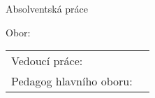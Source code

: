 
\pagestyle{StyleBlank}

\begin{center}

	\begin{Large}
		\noindent
		{\textbf{\MakeUppercase{\skola}}}
	\end{Large}

	\vfill

	\begin{Large}
		\noindent
		Absolventská práce
	\end{Large}

	\begin{spacing}{1.8}
		\begin{huge}
			\noindent
			\textbf{\MakeUppercase{\appTema}}
		\end{huge}
	\end{spacing}

	\vfill

	\begin{Large}
		\noindent
		\textbf{\autor}
	\end{Large}


	\begin{large}
		\noindent
		Obor: {\studijniObor}

		\noindent
		{\studijniProgram}
	\end{large}

\end{center}

\vfill

\begin{large}
	\begin{tabularx}{\textwidth}{ l X }
		Vedoucí práce:	& {\appVedouci} \\
		Pedagog hlavního oboru:	& {\appUcitel} \\
	\end{tabularx}
\end{large}

\vfill

\begin{center}
	\begin{large}
		\noindent
		\textbf{\MakeUppercase{\misto}}

		\noindent
		\textbf{\MakeUppercase{\skolniRok}}
	\end{large}
\end{center}

\newpage
